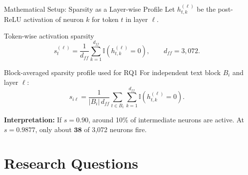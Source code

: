 \documentclass[aspectratio=169,10pt]{beamer}
\newcommand{\I}{\mathbb{I}}
\begin{document}
\begin{frame}{Mathematical Setup: Sparsity as a Layer-wise Profile}
Let $h_{t,k}^{(\ell)}$ be the post-ReLU activation of neuron $k$ for token $t$ in layer $\ell$.
\begin{block}{Token-wise activation sparsity}
\begin{equation}
  s_t^{(\ell)}=\frac{1}{d_{ff}}\sum_{k=1}^{d_{ff}}\I\!\left(h_{t,k}^{(\ell)}=0\right),
  \qquad d_{ff}=3{,}072.
  \label{eq:sparsity_token}
\end{equation}
\end{block}
\begin{block}{Block-averaged sparsity profile used for RQ1}
For independent text block $B_i$ and layer $\ell$:
\begin{equation}
  s_{i\ell}=\frac{1}{|B_i|\,d_{ff}}
  \sum_{t\in B_i}\sum_{k=1}^{d_{ff}}\I\!\left(h_{t,k}^{(\ell)}=0\right).
  \label{eq:sparsity_block}
\end{equation}
\end{block}
\vspace{2pt}
\small\textbf{Interpretation:} If $s=0.90$, around 10\% of intermediate neurons are active. At $s=0.9877$, only about $\mathbf{38}$ of 3,072 neurons fire.
\end{frame}

\section{Research Questions}
\end{document}
